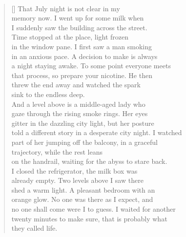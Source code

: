 \documentclass{book}
\begin{document}
\newpage

\poemtitle{\textcolor[RGB]{165,15,15}{Another summer proscenium}}
\hspace*{\fill} \\
\settowidth{\versewidth}{told a different story in a desperate city night. I watched}
\begin{verse}[\versewidth]
    That July night is not clear in my\\
    memory now. I went up for some milk when\\
    I suddenly saw the building across the street.\\
    Time stopped at the place, light frozen\\
    in the window pane. I first saw a man smoking \\
    in an anxious pace. A decision to make is always\\
    a night staying awake. To some point everyone meets\\
    that process, so prepare your nicotine. He then\\
    threw the end away and watched the spark\\
    sink to the endless deep. \\
    And a level above is a middle-aged lady who\\
    gaze through the rising smoke rings. Her eyes\\
    gitter in the dazzling city light, but her posture \\
    told a different story in a desperate city night. I watched\\
    part of her jumping off the balcony, in a graceful\\
    trajectory, while the rest leans\\
    on the handrail, waiting for the abyss to stare back.\\
    I closed the refrigerator, the milk box was\\
    already empty. Two levels above I saw there\\
    shed a warm light. A pleasant bedroom with an\\
    orange glow. No one was there as I expect, and\\
    no one shall come were I to guess. I waited for another\\
    twenty minutes to make sure, that is probably what\\
    they called life.\\
\end{verse}
\end{document}
